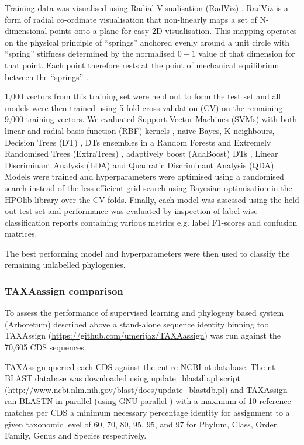 Training data was visualised using Radial Visualisation (RadViz) \citep{Hoffman1997,Fayyad2001}.
RadViz is a form of radial co-ordinate visualisation that non-linearly maps a set of N-dimensional 
points onto a plane for easy 2D visualisation. This mapping operates on the physical principle
of ``springs'' anchored evenly around a unit circle with ``spring'' stiffness determined by 
the normalised \(0-1\) value of that dimension for that point.  Each point therefore rests
at the point of mechanical equilibrium between the ``springs'' \citep{NovakovaLenkaandStepankova2006}.

1,000 vectors from this training set were held out to form the test set and all models were then trained
using 5-fold cross-validation (CV) on the remaining 9,000 training vectors. 
We evaluated Support Vector Machines (SVMs) with both linear and radial basis function (RBF) kernels
\citep{Vapnik1963}, naive Bayes, K-neighbours, 
Decision Trees (DT) \citep{Quinlan1986}, DTs ensembles in a Random Forests \citep{Breiman2001}
and Extremely Randomised Trees (ExtraTrees) \citep{Geurts2006},
adaptively boost (AdaBoost) DTs \citep{Freund1997}, Linear Discriminant Analysis (LDA) and
Quadratic Discriminant Analysis (QDA).
Models were trained and hyperparameters were optimised using a randomised search instead of the less
efficient grid search \citep{Bergstra2012} using Bayesian optimisation in the HPOlib library \citep{Eggensperger2013,Komer2014} over the CV-folds.  
Finally, each model was assessed using the held out test set and performance was 
evaluated by inspection of label-wise classification reports containing various
metrics e.g. label F1-scores and confusion matrices.
 
The best performing model and hyperparameters were then used to classify the remaining
unlabelled phylogenies.

\subsubsection{TAXAassign comparison}

To assess the performance of supervised learning and phylogeny based system (Arboretum)
described above a stand-alone sequence identity binning tool TAXAssign (\url{https://github.com/umerijaz/TAXAassign}) was run 
against the 70,605 CDS sequences.  

TAXAssign queried each CDS against the entire NCBI nt database.
The nt BLAST database was downloaded using update\_blastdb.pl script (\url{http://www.ncbi.nlm.nih.gov/blast/docs/update_blastdb.pl})
and TAXAssign ran BLASTN in parallel (using GNU parallel \citep{Tange2011a})
with a maximum of 10 reference matches
per CDS a minimum necessary percentage identity for assignment
to a given taxonomic level of 60, 70, 80, 95, 95, and 97
for Phylum, Class, Order, Family, Genus and Species respectively. 

